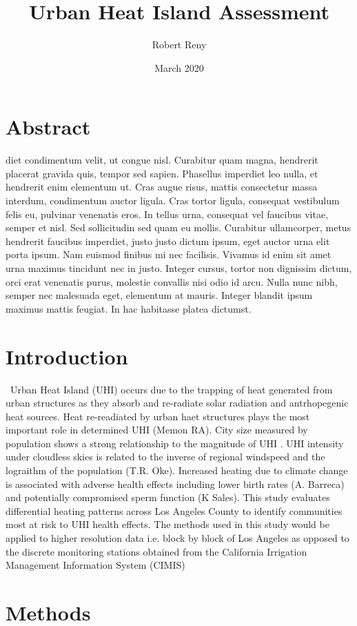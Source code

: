 \documentclass[letterpaper]{article}
\title{Urban Heat Island Assessment}
\author{Robert Reny}
\date{March 2020}
\begin{document}
\maketitle 
\section*{Abstract} %
diet condimentum velit, ut congue nisl. Curabitur quam magna, hendrerit placerat gravida quis, tempor sed sapien. Phasellus imperdiet leo nulla, et hendrerit enim elementum ut. Cras augue risus, mattis consectetur massa interdum, condimentum auctor ligula. Cras tortor ligula, consequat vestibulum felis eu, pulvinar venenatis eros. In tellus urna, consequat vel faucibus vitae, semper et nisl. Sed sollicitudin sed quam eu mollis. Curabitur ullamcorper, metus hendrerit faucibus imperdiet, justo justo dictum ipsum, eget auctor urna elit porta ipsum. Nam euismod finibus mi nec facilisis. Vivamus id enim sit amet urna maximus tincidunt nec in justo. Integer cursus, tortor non dignissim dictum, orci erat venenatis purus, molestie convallis nisi odio id arcu. Nulla nunc nibh, semper nec malesuada eget, elementum at mauris. Integer blandit ipsum maximus mattis feugiat. In hac habitasse platea dictumst.
\newpage
\tableofcontents
\listoffigures
\newpage
\section{Introduction}\
Urban Heat Island (UHI) occurs due to the trapping of heat generated from urban structures as they absorb and re-radiate solar radiation and antrhopegenic heat sources. Heat re-readiated by urban haet structures plays the most important role in determined UHI (Memon RA). City size measured by population shows a strong relationship to the magnitude of UHI . UHI intensity under cloudless skies is related to the inverse of regional windspeed and the lograithm of the population (T.R. Oke). Increased heating due to climate change is associated with adverse health effects including lower birth rates (A. Barreca) and potentially compromised sperm function (K Sales). This study evaluates differential heating patterns across Los Angeles County to identify communities most at risk to UHI health effects. The methods used in this study would be applied to higher resolution data i.e. block by block of Los Angeles as opposed to the discrete monitoring stations obtained from the California Irrigation Management Information System (CIMIS)
\section{Methods} %
\end{document}
